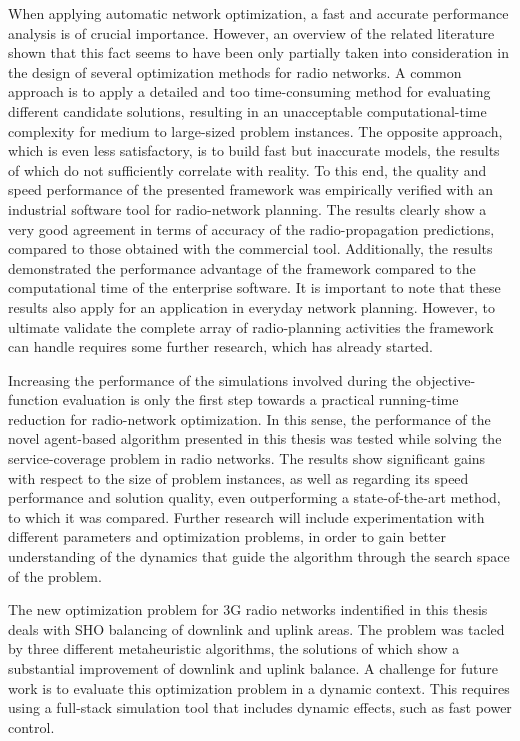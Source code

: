 When applying automatic network optimization, a fast and accurate
performance analysis is of crucial importance. However, an overview
of the related literature shown that this fact seems to have been
only partially taken into consideration in the design of several optimization
methods for radio networks. A common approach is to apply a detailed
and too time-consuming method for evaluating different candidate solutions,
resulting in an unacceptable computational-time complexity for medium
to large-sized problem instances. The opposite approach, which is
even less satisfactory, is to build fast but inaccurate models, the
results of which do not sufficiently correlate with reality. To this
end, the quality and speed performance of the presented framework
was empirically verified with an industrial software tool for radio-network
planning. The results clearly show a very good agreement in terms
of accuracy of the radio-propagation predictions, compared to those
obtained with the commercial tool. Additionally, the results demonstrated
the performance advantage of the framework compared to the computational
time of the enterprise software. It is important to note that these
results also apply for an application in everyday network planning.
However, to ultimate validate the complete array of radio-planning
activities the framework can handle requires some further research,
which has already started.

Increasing the performance of the simulations involved during the
objective-function evaluation is only the first step towards a practical
running-time reduction for radio-network optimization. In this sense,
the performance of the novel agent-based algorithm presented in this
thesis was tested while solving the service-coverage problem in radio
networks. The results show significant gains with respect to the size
of problem instances, as well as regarding its speed performance and
solution quality, even outperforming a state-of-the-art method, to
which it was compared. Further research will include experimentation
with different parameters and optimization problems, in order to gain
better understanding of the dynamics that guide the algorithm through
the search space of the problem.

The new optimization problem for 3G radio networks indentified in
this thesis deals with SHO balancing of downlink and uplink areas.
The problem was tacled by three different metaheuristic algorithms,
the solutions of which show a substantial improvement of downlink
and uplink balance. A challenge for future work is to evaluate this
optimization problem in a dynamic context. This requires using a full-stack
simulation tool that includes dynamic effects, such as fast power
control.

